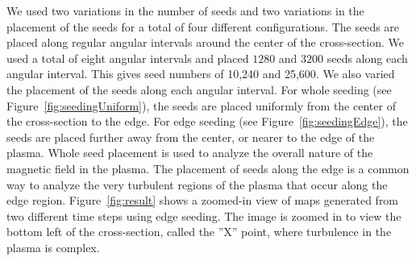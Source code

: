 We used two variations in the number of seeds and two variations in the placement of the seeds for a total of four different configurations.
The seeds are placed along regular angular intervals around the center of the cross-section. We used a total of eight angular intervals and placed $1280$ and $3200$ seeds along each angular interval. This gives seed numbers of 10,240 and 25,600. We also varied the placement of the seeds along each angular interval. For whole seeding (see Figure~\ref{fig:seedingUniform}), the seeds are placed uniformly from the center of the cross-section to the edge. For edge seeding (see Figure~\ref{fig:seedingEdge}), the seeds are placed further away from the center, or nearer to the edge of the plasma.  Whole seed placement is used to analyze the overall nature of the magnetic field in the plasma. The placement of seeds along the edge is a common way to analyze the very turbulent regions of the plasma that occur along the edge region. Figure~\ref{fig:result} shows a zoomed-in view of \poincare maps generated from two different time steps using edge seeding. The image is zoomed in to view the bottom left of the cross-section, called the ''X'' point, where turbulence in the plasma is complex.

